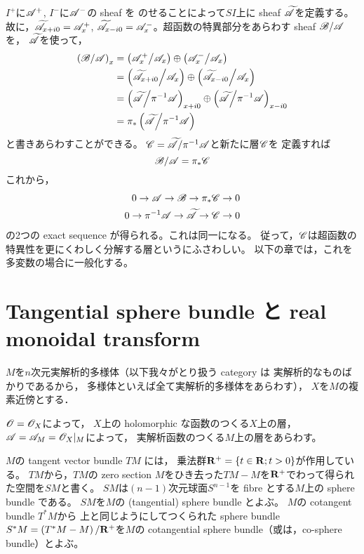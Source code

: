 \(I^+\)に\(\mathscr{A}^{+}\), \(I^-\)に\(\mathscr{A}^{-}\)の sheaf を
のせることによって\(SI\)上に sheaf \(\widetilde{\mathscr{A}}\)を定義する。
故に，\(
    \widetilde{\mathscr{A}}_{x+i0}=\mathscr{A}^{+}_x
\), \(
    \widetilde{\mathscr{A}}_{x-i0}=\mathscr{A}^{-}_x
\)。超函数の特異部分をあらわす sheaf \(\mathscr{B}/\mathscr{A}\)を，
\(\widetilde{\mathscr{A}}\)を使って，
\begin{align*}
    \left(\mathscr{B}\middle/\mathscr{A}\right)_x
    &=
    \left(\mathscr{A}^{+}_x\middle/\mathscr{A}_x\right)\oplus
    \left(\mathscr{A}^{-}_x\middle/\mathscr{A}_x\right)\\
    &=
    \left(\widetilde{\mathscr{A}}_{x+i0}\middle/\mathscr{A}_x\right)\oplus
    \left(\widetilde{\mathscr{A}}_{x-i0}\middle/\mathscr{A}_x\right)\\
    &=
    \left(\widetilde{\mathscr{A}}\middle/\pi^{-1}\mathscr{A}\right)_{x+i0}\oplus
    \left(\widetilde{\mathscr{A}}\middle/\pi^{-1}\mathscr{A}\right)_{x-i0}\\
    &=
    \pi_{\ast}\left(\widetilde{\mathscr{A}}\middle/\pi^{-1}\mathscr{A}\right)
\end{align*}
と書きあらわすことができる。
\(\mathscr{C}=\widetilde{\mathscr{A}}/\pi^{-1}\mathscr{A}\)と新たに層\(\mathscr{C}\)を
定義すれば
\begin{equation}
    \mathscr{B}/\mathscr{A}=\pi_{\ast}\mathscr{C}
\end{equation}
これから，
\begin{align*}
    0\to\mathscr{A}\to\mathscr{B}\to\pi_{\ast}\mathscr{C}\to0\\
    0\to\pi^{-1}\mathscr{A}\to\widetilde{\mathscr{A}}\to\mathscr{C}\to0
\end{align*}
の2つの exact sequence が得られる。これは同一になる。
従って，\(\mathscr{C}\)は超函数の特異性を更にくわしく分解する層というにふさわしい。
以下の章では，これを多変数の場合に一般化する。

\clearpage
\section{Tangential sphere bundle と real monoidal transform}
\(M\)を\(n\)次元実解析的多様体（以下我々がとり扱う category は
実解析的なものばかりであるから，
多様体といえば全て実解析的多様体をあらわす），
\(X\)を\(M\)の複素近傍とする．

\(\mathscr{O}=\mathscr{O}_X\)によって，
\(X\)上の holomorphic な函数のつくる\(X\)上の層，
\(\mathscr{A}=\mathscr{A}_M=\mathscr{O}_X\rvert_M\)によって，
実解析函数のつくる\(M\)上の層をあらわす。

\(M\)の tangent vector bundle \(TM\) には，
乗法群\(\mathbf{R}^+=\{t\in\mathbf{R}; t>0\}\)が作用している。
\(TM\)から，\(TM\)の zero section \(M\)をひき去った\(
    TM-M
\)を\(\mathbf{R}^+\)でわって得られた空間を\(SM\)と書く。
\(SM\)は\((n-1)\)次元球面\(S^{n-1}\)を fibre とする\(M\)上の 
sphere bundle である。
\(SM\)を\(M\)の (tangential) sphere bundle とよぶ。
\(M\)の cotangent bundle \(T^{\ast}M\)から
上と同じようにしてつくられた sphere bundle \(
    S^{\ast}M=\left(T^{\ast}M-M\right)/\mathbf{R}^+
\)を\(M\)の cotangential sphere 
bundle（或は，co-sphere bundle）とよぶ。

